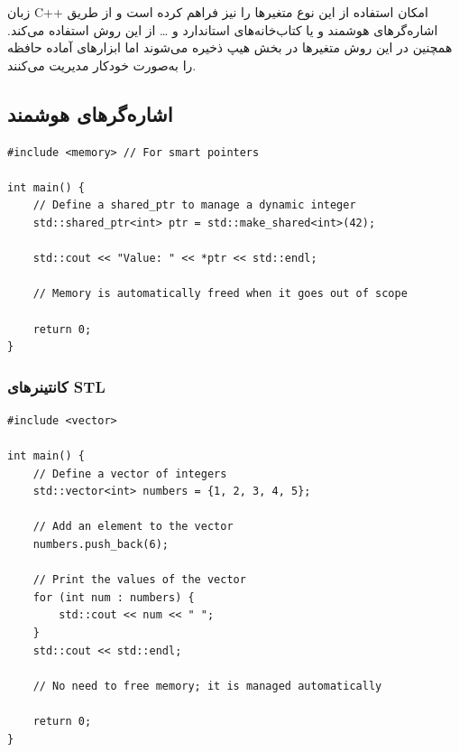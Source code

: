 \documentclass{article}
\begin{document}
زبان C++ امکان استفاده از این نوع متغیرها را نیز فراهم کرده است و از طریق اشاره‌گر‌های هوشمند و یا کتاب‌خانه‌های استاندارد و … از این روش استفاده می‌کند. همچنین در این روش متغیر‌ها در بخش هیپ ذخیره می‌شوند اما ابزار‌های آماده حافظه را به‌‌صورت خودکار مدیریت می‌‌‌کنند.


\subsection*{اشاره‌گرهای هوشمند}


\begin{LTR} %
\begin{lstlisting}
#include <memory> // For smart pointers

int main() {
    // Define a shared_ptr to manage a dynamic integer
    std::shared_ptr<int> ptr = std::make_shared<int>(42);

    std::cout << "Value: " << *ptr << std::endl;

    // Memory is automatically freed when it goes out of scope

    return 0;
}
\end{lstlisting}
\end{LTR}

\subsubsection*{کانتینرهای STL}
\begin{LTR} %
\begin{lstlisting}
#include <vector>

int main() {
    // Define a vector of integers
    std::vector<int> numbers = {1, 2, 3, 4, 5};

    // Add an element to the vector
    numbers.push_back(6);

    // Print the values of the vector
    for (int num : numbers) {
        std::cout << num << " ";
    }
    std::cout << std::endl;

    // No need to free memory; it is managed automatically

    return 0;
}
\end{lstlisting}
\end{LTR}
\end{document}
